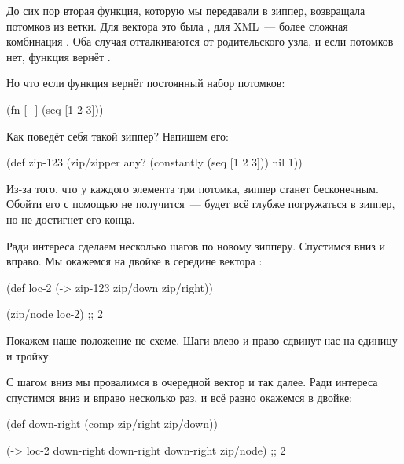 До сих пор вторая функция, которую мы передавали в зиппер, возвращала потомков
из ветки. Для вектора это была , для XML~--- более сложная комбинация
. Оба случая отталкиваются от родительского узла, и
если потомков нет, функция вернёт .

Но что если функция вернёт постоянный набор потомков:

\begin{english}
  \begin{clojure}
(fn [_]
  (seq [1 2 3]))
  \end{clojure}
\end{english}

Как поведёт себя такой зиппер? Напишем его:

\begin{english}
  \begin{clojure}
(def zip-123
  (zip/zipper any?
              (constantly (seq [1 2 3]))
              nil
              1))
  \end{clojure}
\end{english}


Из-за того, что у каждого элемента три потомка, зиппер станет бесконечным. Обойти
его с помощью  не получится~---  будет всё глубже погружаться
в зиппер, но не достигнет его конца.

Ради интереса сделаем несколько шагов по новому зипперу. Спустимся вниз и
вправо. Мы окажемся на двойке в середине вектора \code{[1 2 3]}:

\begin{english}
  \begin{clojure}
(def loc-2
  (-> zip-123
      zip/down
      zip/right))

(zip/node loc-2)
;; 2
  \end{clojure}
\end{english}

Покажем наше положение не схеме. Шаги влево и право сдвинут нас на единицу и
тройку:

\begin{figure}[H]
  \centering
  
\end{figure}

С шагом вниз мы провалимся в очередной вектор \code{[1 2 3]} и так далее. Ради
интереса спустимся вниз и вправо несколько раз, и всё равно окажемся в двойке:

\begin{english}
  \begin{clojure}
(def down-right
  (comp zip/right zip/down))

(-> loc-2
    down-right
    down-right
    down-right
    zip/node)
;; 2
  \end{clojure}
\end{english}

